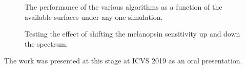 \begin{figure}[htbp]
 \caption{The performance of the various algorithms as a function of the available surfaces under any one simulation.}
 \label{fig:4asum}
\end{figure} 

\begin{figure}[htbp]
 \caption{Testing the effect of shifting the melanopsin sensitivity up and down the spectrum.}
 \label{fig:9opt}
\end{figure} 

The work was presented at this stage at ICVS 2019 as an oral presentation.